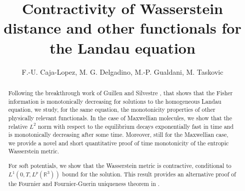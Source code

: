 \documentclass[11pt]{amsart}
\numberwithin{equation}{section}
\begin{document}
\title[Contractivity of Wasserstein distance and other functionals]{
  Contractivity of Wasserstein distance and other functionals for the Landau equation
  }


\author{F.-U. Caja-Lopez, M. G. Delgadino, M.-P. Gualdani, M. Taskovic}

\address{Department of Mathematics, The University of Texas at Austin (USA)}
\address{Department of Mathematics, Emory University (USA)}


\begin{abstract}
  Following the breakthrough work of Guillen and Silvestre \cite{GS24}, that shows that the Fisher information is monotonically decreasing for solutions to the homogeneous Landau equation, 
  we study, for the same equation,  the monotonicity properties of other physically relevant functionals. In the case of Maxwellian molecules, we show that the relative $L^2$ norm with respect to the equilibrium decays exponentially fast in time and is monotonically decreasing after some time. Moreover, still for the Maxwellian case, we provide a novel and short quantitative proof of time monotonicity of the  entropic Wasserstein metric. 
  
  For soft potentials, we show that the Wasserstein metric is contractive, conditional to $L^1(0,T,L^p(\mathbb{R}^3))$ bound for the solution. This result provides an alternative proof of the   Fournier and  Fournier-Guerin uniqueness theorem in  \cite{fournier2009well_posedness_soft_potentials}  \cite{fournier2010uniqueness_Coulomb} . 
  
\end{abstract}


\maketitle
\end{document}
